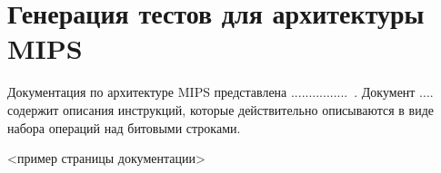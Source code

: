 \documentclass[14pt]{extreport}
\newtheorem{utv}{Утверждение}
\begin{document}



\section{Генерация тестов для архитектуры MIPS}


Документация по архитектуре MIPS представлена
................~\cite{??????????}. Документ
.... содержит описания инструкций, которые действительно описываются в виде
набора
операций над битовыми строками.

<пример страницы документации>
\end{document}
